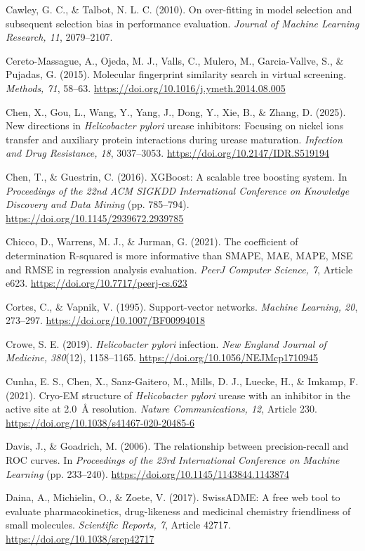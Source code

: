 \documentclass[11pt]{article}
\begin{document}
Cawley, G. C., \& Talbot, N. L. C. (2010). On over-fitting in model selection and subsequent selection bias in performance evaluation. \textit{Journal of Machine Learning Research, 11}, 2079--2107.

Cereto-Massague, A., Ojeda, M. J., Valls, C., Mulero, M., Garcia-Vallve, S., \& Pujadas, G. (2015). Molecular fingerprint similarity search in virtual screening. \textit{Methods, 71}, 58--63. \url{https://doi.org/10.1016/j.ymeth.2014.08.005}

Chen, X., Gou, L., Wang, Y., Yang, J., Dong, Y., Xie, B., \& Zhang, D. (2025). New directions in \textit{Helicobacter pylori} urease inhibitors: Focusing on nickel ions transfer and auxiliary protein interactions during urease maturation. \textit{Infection and Drug Resistance, 18}, 3037--3053. \url{https://doi.org/10.2147/IDR.S519194}

Chen, T., \& Guestrin, C. (2016). XGBoost: A scalable tree boosting system. In \textit{Proceedings of the 22nd ACM SIGKDD International Conference on Knowledge Discovery and Data Mining} (pp. 785--794). \url{https://doi.org/10.1145/2939672.2939785}

Chicco, D., Warrens, M. J., \& Jurman, G. (2021). The coefficient of determination R-squared is more informative than SMAPE, MAE, MAPE, MSE and RMSE in regression analysis evaluation. \textit{PeerJ Computer Science, 7}, Article e623. \url{https://doi.org/10.7717/peerj-cs.623}

Cortes, C., \& Vapnik, V. (1995). Support-vector networks. \textit{Machine Learning, 20}, 273--297. \url{https://doi.org/10.1007/BF00994018}

Crowe, S. E. (2019). \textit{Helicobacter pylori} infection. \textit{New England Journal of Medicine, 380}(12), 1158--1165. \url{https://doi.org/10.1056/NEJMcp1710945}

Cunha, E. S., Chen, X., Sanz-Gaitero, M., Mills, D. J., Luecke, H., \& Imkamp, F. (2021). Cryo-EM structure of \textit{Helicobacter pylori} urease with an inhibitor in the active site at 2.0~\AA{} resolution. \textit{Nature Communications, 12}, Article 230. \url{https://doi.org/10.1038/s41467-020-20485-6}

Davis, J., \& Goadrich, M. (2006). The relationship between precision-recall and ROC curves. In \textit{Proceedings of the 23rd International Conference on Machine Learning} (pp. 233--240). \url{https://doi.org/10.1145/1143844.1143874}

Daina, A., Michielin, O., \& Zoete, V. (2017). SwissADME: A free web tool to evaluate pharmacokinetics, drug-likeness and medicinal chemistry friendliness of small molecules. \textit{Scientific Reports, 7}, Article 42717. \url{https://doi.org/10.1038/srep42717}
\end{document}
